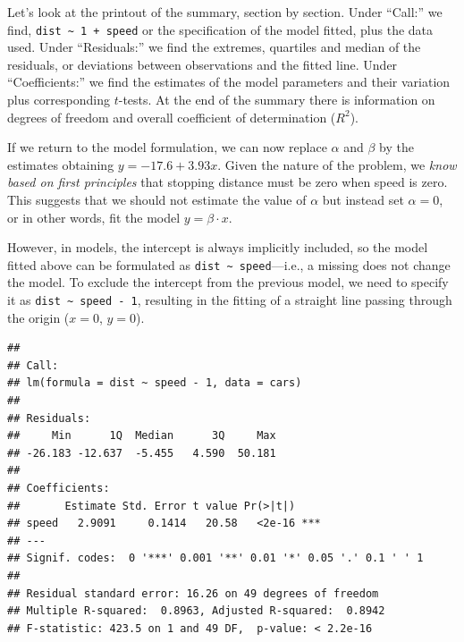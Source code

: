 \documentclass[krantz2]{krantz}\usepackage{knitr}
\begin{document}
Let's look at the printout of the summary, section by section. Under ``Call:'' we find, \verb|dist ~ 1 + speed| or the specification of the model fitted, plus the data used. Under ``Residuals:'' we find the extremes, quartiles and median of the residuals, or deviations between observations and the fitted line. Under ``Coefficients:'' we find the estimates of the model parameters and their variation plus corresponding $t$-tests. At the end of the summary there is information on degrees of freedom and overall coefficient of determination ($R^2$).

If we return to the model formulation, we can now replace $\alpha$ and $\beta$ by the estimates obtaining $y = -17.6 + 3.93 x$. Given the nature of the problem, we \emph{know based on first principles} that stopping distance must be zero when speed is zero. This suggests that we should not estimate the value of $\alpha$ but instead set $\alpha = 0$, or in other words, fit the model $y = \beta \cdot x$.

However, in \Rlang models, the intercept is always implicitly included, so the model fitted above can be formulated as \verb|dist ~ speed|---i.e., a missing  does not change the model. To exclude the intercept from the previous model, we need to specify it as \verb|dist ~ speed - 1|, resulting in the fitting of a straight line passing through the origin ($x = 0$, $y = 0$).

\begin{knitrout}\footnotesize
{}\color{fgcolor}\begin{kframe}
\begin{alltt}
 \hlkwb{<-}  \hlopt{~}  \hlopt{-} \hlstd{,}  
\end{alltt}
\begin{verbatim}
##
## Call:
## lm(formula = dist ~ speed - 1, data = cars)
##
## Residuals:
##     Min      1Q  Median      3Q     Max
## -26.183 -12.637  -5.455   4.590  50.181
##
## Coefficients:
##       Estimate Std. Error t value Pr(>|t|)
## speed   2.9091     0.1414   20.58   <2e-16 ***
## ---
## Signif. codes:  0 '***' 0.001 '**' 0.01 '*' 0.05 '.' 0.1 ' ' 1
##
## Residual standard error: 16.26 on 49 degrees of freedom
## Multiple R-squared:  0.8963,	Adjusted R-squared:  0.8942
## F-statistic: 423.5 on 1 and 49 DF,  p-value: < 2.2e-16
\end{verbatim}
\end{kframe}
\end{knitrout}
\end{document}
